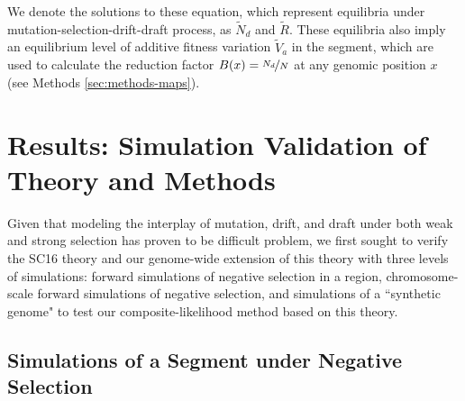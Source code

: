 \documentclass[11pt]{article}
\begin{document}
We denote the solutions to these equation, which represent equilibria under
mutation-selection-drift-draft process, as $\widetilde{N}_d$ and
$\widetilde{R}$. These equilibria also imply an equilibrium level of additive
fitness variation $\widetilde{V}_a$ in the segment, which are used to calculate
the reduction factor $B(x) = \nicefrac{N_d}{N}$ at any genomic position $x$
(see Methods \ref{sec:methods-maps}).

\section*{Results: Simulation Validation of Theory and Methods}

Given that modeling the interplay of mutation, drift, and draft under both weak
and strong selection has proven to be difficult problem, we first sought to
verify the SC16 theory and our genome-wide extension of this theory with three
levels of simulations: forward simulations of negative selection in a region,
chromosome-scale forward simulations of negative selection, and simulations of
a ``synthetic genome" to test our composite-likelihood method based on this
theory.

\subsection*{Simulations of a Segment under Negative Selection}
\label{sec:segment-sims}
\end{document}
